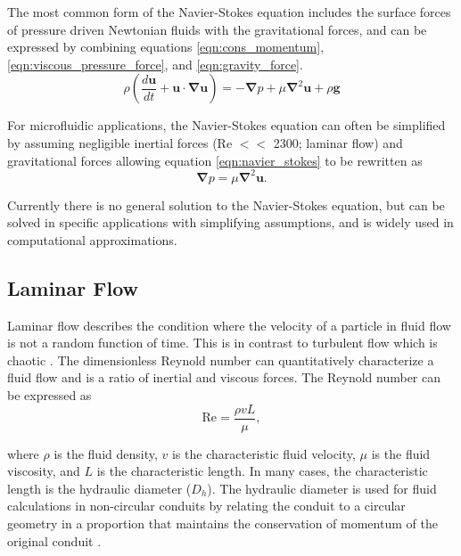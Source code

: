 \par The most common form of the Navier-Stokes equation includes the surface forces of pressure driven Newtonian fluids with the gravitational forces, and can be expressed by combining equations \ref{eqn:cons_momentum}, \ref{eqn:viscous_pressure_force}, and \ref{eqn:gravity_force}. 
\begin{equation}
    \rho(\frac{d\textbf{u}}{dt} + \textbf{u}\cdot\boldsymbol{\nabla}\textbf{u}) = -\boldsymbol{\nabla}p + \mu\boldsymbol{\nabla}^2\textbf{u} + \rho \textbf{g}
    \label{eqn:navier_stokes}
\end{equation}

\noindent For microfluidic applications, the Navier-Stokes equation can often be simplified by assuming negligible inertial forces (Re $<<$ 2300; laminar flow) and gravitational forces allowing equation \ref{eqn:navier_stokes} to be rewritten as
\begin{equation}
        \boldsymbol{\nabla}p = \mu\boldsymbol{\nabla}^2\textbf{u}.
\end{equation}

\par Currently there is no general solution to the Navier-Stokes equation, but can be solved in specific applications with simplifying assumptions, and is widely used in computational approximations.

\subsection*{Laminar Flow}
\par Laminar flow describes the condition where the velocity of a particle in fluid flow is not a random function of time. This is in contrast to turbulent flow which is chaotic \cite{david_j._beebe_physics_2002}. The dimensionless Reynold number can quantitatively characterize a fluid flow and is a ratio of inertial and viscous forces. The Reynold number can be expressed as
\begin{equation}
    \text{Re} = \frac{\rho v L}{\mu},
\end{equation}

\noindent where $\rho$ is the fluid density, $v$ is the characteristic fluid velocity, $\mu$ is the fluid viscosity, and $L$ is the characteristic length. In many cases, the characteristic length is the hydraulic diameter ($D_h$). The hydraulic diameter is used for fluid calculations in non-circular conduits by relating the conduit to a circular geometry in a proportion that maintains the conservation of momentum of the original conduit \cite{david_j._beebe_physics_2002}.

